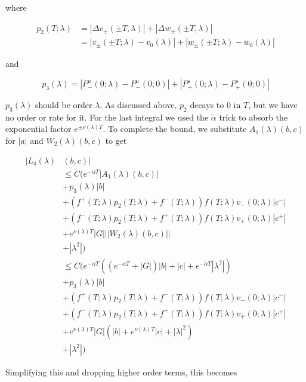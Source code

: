 \documentclass[12pt]{article}
\begin{document}
\begin{enumerate}
where

\begin{align*}
p_2(T; \lambda) &= |\Delta v_\pm(\pm T, \lambda)| + |\Delta w_\pm(\pm T, \lambda)|\\
&= |v_\pm(\pm T; \lambda) - v_0(\lambda)| + |w_\pm(\pm T; \lambda) - w_0(\lambda)|
\end{align*}

and

\[
p_3(\lambda) = |P^u_-(0;\lambda) - P^u_-(0; 0)| + |P^s_+(0;\lambda) - P^s_+(0;0)|
\]

$p_3(\lambda)$ should be order $\lambda$. As discussed above, $p_2$ decays to 0 in $T$, but we have no order or rate for it. For the last integral we used the $\tilde{\alpha}$ trick to absorb the exponential factor $e^{\pm \nu(\lambda) T}$. To complete the bound, we substitute $A_1(\lambda)(b,c)$ for $|a|$ and $W_2(\lambda)(b,c)$ to get

\begin{align*}
|L_4(\lambda)&(b, c)| \\
&\leq C( e^{-\alpha T}|A_1(\lambda)(b,c)| \\
&+ p_3(\lambda)|b| \\ 
&+ (f^+(T; \lambda) p_2(T; \lambda) + f^-(T; \lambda)) f(T; \lambda) v_-(0; \lambda) |c^-| \\
&+ (f^-(T; \lambda) p_2(T; \lambda) + f^+(T; \lambda)) f(T; \lambda) v_+(0; \lambda) |c^+| \\
&+ e^{\nu(\lambda)T}|G|||W_2(\lambda)(b,c)|| \\
&+ |\lambda^2|) \\
&\leq C( e^{-\alpha T}( (e^{-\alpha T} + |G|)|b| + |c| + e^{-\tilde{\alpha}T} |\lambda^2|)\\
&+ p_3(\lambda)|b| \\ 
&+ (f^+(T; \lambda) p_2(T; \lambda) + f^-(T; \lambda)) f(T; \lambda) v_-(0; \lambda) |c^-| \\
&+ (f^-(T; \lambda) p_2(T; \lambda) + f^+(T; \lambda)) f(T; \lambda) v_+(0; \lambda) |c^+| \\
&+ e^{\nu(\lambda)T}|G|(|b| + e^{\nu(\lambda)T}|c| + |\lambda|^2)  \\
&+ |\lambda^2|)
\end{align*}

Simplifying this and dropping higher order terms, this becomes


\end{enumerate}
\end{document}

